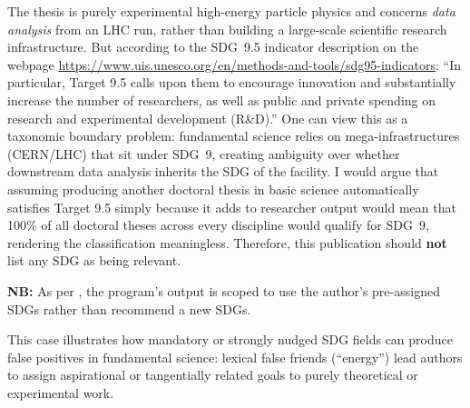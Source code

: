 \begin{casestudySection}
The thesis is purely experimental high-energy particle physics and concerns \textit{data analysis} from an \gls{LHC} run, rather than building a large-scale scientific research infrastructure. But according to the \gls{SDG}~9.5 indicator description on the webpage \url{https://www.uis.unesco.org/en/methods-and-tools/sdg95-indicators}: \enquote{In particular, Target 9.5 calls upon them to encourage innovation and substantially increase the number of researchers, as well as public and private spending on research and experimental development (R\&D).} One can view this as a taxonomic boundary problem: fundamental science relies on mega-infrastructures (\gls{CERN}/\gls{LHC}) that sit under \gls{SDG}~9, creating ambiguity over whether downstream data analysis inherits the \gls{SDG} of the facility. I would argue that assuming producing another doctoral thesis in basic science automatically satisfies Target 9.5 simply because it adds to researcher output would mean that 100\% of all doctoral theses across every discipline would qualify for \gls{SDG}~9, rendering the classification meaningless. Therefore, this publication should \textbf{not} list any \gls{SDG} as being relevant.
\medskip

\textbf{NB:} As per , the program's output is scoped to use the author's pre-assigned \glspl{SDG} rather than recommend a new \glspl{SDG}.
\end{casestudySection}

\begin{takeaway}
This case illustrates how mandatory or strongly nudged \gls{SDG} fields can produce false positives in fundamental science: lexical false friends (\enquote{energy}) lead authors to assign aspirational or tangentially related goals to purely theoretical or experimental work.
\end{takeaway}

